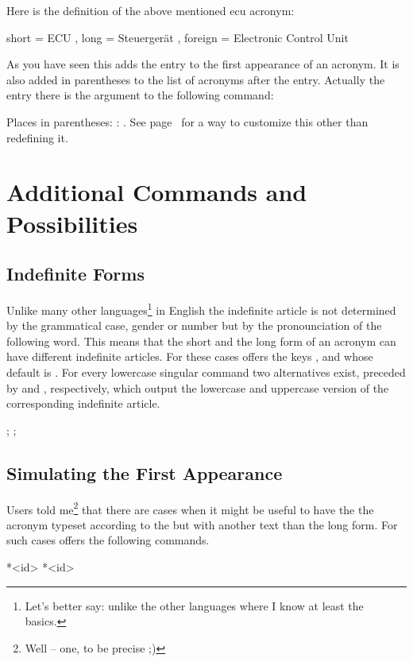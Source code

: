 \documentclass[DIV10,toc=index,toc=bib,hyperfootnotes=false]{cnpkgdoc}
\makeatletter
\providecommand*\sinceversion[1]{%
  \@bsphack
  \marginnote{%
    \footnotesize\sffamily\RaggedRight
    \textcolor{black!75}{Introduced in version~#1}}%
  \@esphack}
\makeatother
\begin{document}
Here is the definition of the above mentioned \ac{ecu} acronym:
\begin{beispiel}
   {
     short   = ECU ,
     long    = Steuergerät ,
     foreign = Electronic Control Unit
   }
\end{beispiel}
As you have seen this adds the  entry to the first appearance of
an acronym. It is also added in parentheses to the list of acronyms after the
 entry. Actually the entry there is the argument to the following
command:
\begin{beschreibung}
 \newline
   Places  in parentheses: :
   . See page~\pageref{key:list-foreign-format} for a way
   to customize this other than redefining it.
\end{beschreibung}

\section{Additional Commands and Possibilities}
\subsection{Indefinite Forms}
\noindent\sinceversion{1.2}%
Unlike many other languages\footnote{Let's better say: unlike the other
languages where I know at least the basics.} in English the indefinite article
is not determined by the grammatical case, gender or number but by the
pronounciation of the following word. This means that the short and the long
form of an acronym can have different indefinite articles. For these cases \acro
offers the keys ,  and
 whose default is . For every lowercase singular
command two alternatives exist, preceded by  and , respectively,
which output the lowercase and uppercase version of the corresponding indefinite
article.

\begin{beispiel}
 ; ; 
\end{beispiel}

\subsection{Simulating the First Appearance}
\noindent\sinceversion{1.2}%
Users told me\footnote{Well -- one, to be precise ;)} that there are cases when it
might be useful to have the the acronym typeset according to the 
but with another text than the long form. For such cases \acro offers the
following commands.
\begin{beschreibung}
 *{<id>}
 *{<id>}
\end{beschreibung}
\end{document}
